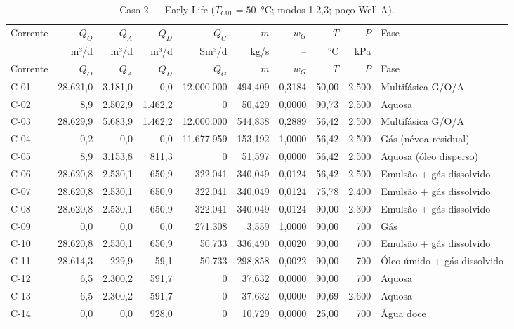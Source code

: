 \documentclass[11pt,a4paper]{article}
\numberwithin{equation}{section}
\numberwithin{table}{section}
\numberwithin{figure}{section}
\begin{document}
{\footnotesize\setlength{\tabcolsep}{3pt}\begin{longtable}{lrrrrrrrrL{2.5cm}}
\caption{Caso 2 --- Early Life ($T_{C01}=50$~°C; modos 1,2,3; poço Well A).}\\\toprule
Corrente & $Q_O$ & $Q_A$ & $Q_D$ & $Q_G$ & $\dot m$ & $w_G$ & $T$ & $P$ & Fase\\ & m³/d & m³/d & m³/d & Sm³/d & kg/s & -- & °C & kPa & \\\midrule\endfirsthead
\toprule Corrente & $Q_O$ & $Q_A$ & $Q_D$ & $Q_G$ & $\dot m$ & $w_G$ & $T$ & $P$ & Fase\\\midrule\endhead
C-01 & 28.621,0 & 3.181,0 & 0,0 & 12.000.000 & 494,409 & 0,3184 & 50,00 & 2.500 & {\scriptsize Multifásica G/O/A}\\
C-02 & 8,9 & 2.502,9 & 1.462,2 & 0 & 50,429 & 0,0000 & 90,73 & 2.500 & {\scriptsize Aquosa}\\
C-03 & 28.629,9 & 5.683,9 & 1.462,2 & 12.000.000 & 544,838 & 0,2889 & 56,42 & 2.500 & {\scriptsize Multifásica G/O/A}\\
C-04 & 0,2 & 0,0 & 0,0 & 11.677.959 & 153,192 & 1,0000 & 56,42 & 2.500 & {\scriptsize Gás (névoa residual)}\\
C-05 & 8,9 & 3.153,8 & 811,3 & 0 & 51,597 & 0,0000 & 56,42 & 2.500 & {\scriptsize Aquosa (óleo disperso)}\\
C-06 & 28.620,8 & 2.530,1 & 650,9 & 322.041 & 340,049 & 0,0124 & 56,42 & 2.500 & {\scriptsize Emulsão + gás dissolvido}\\
C-07 & 28.620,8 & 2.530,1 & 650,9 & 322.041 & 340,049 & 0,0124 & 75,78 & 2.400 & {\scriptsize Emulsão + gás dissolvido}\\
C-08 & 28.620,8 & 2.530,1 & 650,9 & 322.041 & 340,049 & 0,0124 & 90,00 & 2.300 & {\scriptsize Emulsão + gás dissolvido}\\
C-09 & 0,0 & 0,0 & 0,0 & 271.308 & 3,559 & 1,0000 & 90,00 & 700 & {\scriptsize Gás}\\
C-10 & 28.620,8 & 2.530,1 & 650,9 & 50.733 & 336,490 & 0,0020 & 90,00 & 700 & {\scriptsize Emulsão + gás dissolvido}\\
C-11 & 28.614,3 & 229,9 & 59,1 & 50.733 & 298,858 & 0,0022 & 90,00 & 700 & {\scriptsize Óleo úmido + gás dissolvido}\\
C-12 & 6,5 & 2.300,2 & 591,7 & 0 & 37,632 & 0,0000 & 90,00 & 700 & {\scriptsize Aquosa}\\
C-13 & 6,5 & 2.300,2 & 591,7 & 0 & 37,632 & 0,0000 & 90,69 & 2.600 & {\scriptsize Aquosa}\\
C-14 & 0,0 & 0,0 & 928,0 & 0 & 10,729 & 0,0000 & 25,00 & 700 & {\scriptsize Água doce}\\

\end{longtable}}
\end{document}
